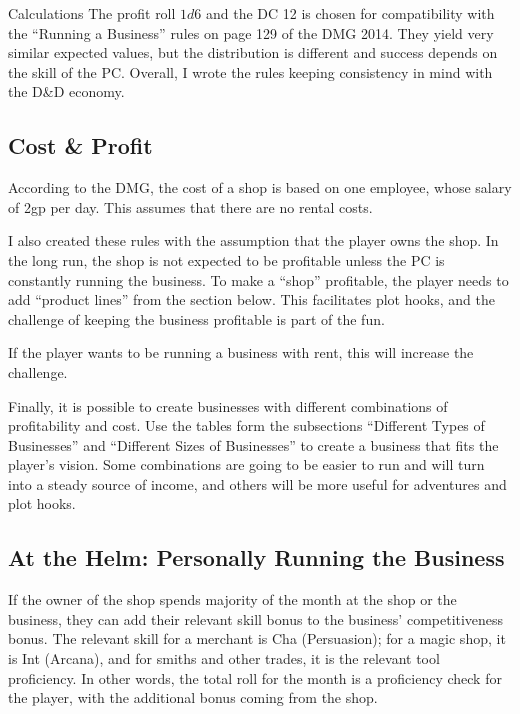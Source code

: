 \documentclass[twocolumn]{dndbook}
\begin{document}
\begin{DndSidebar}[float=!b]{Calculations}
	The profit roll $1d6$ and the DC 12 is chosen for compatibility with
	the ``Running a Business'' rules on page 129 of the DMG 2014.
	They yield very similar expected values, but the distribution is different
	and success depends on the skill of the PC.
	Overall, I wrote the rules keeping consistency in mind with the D\&D economy.
\end{DndSidebar}


\subsection{Cost \& Profit}
According to the DMG, the cost of a shop is based on one employee, whose
salary of 2gp per day. This assumes that there are no rental costs.\par

I also created these rules with the assumption that the player owns the shop.
In the long run, the shop is not expected to be profitable unless
the PC is constantly running the business.
To make a ``shop'' profitable, the player needs to
add ``product lines'' from the section below.
This facilitates plot hooks, and the challenge of keeping the business profitable is part of the fun.\par

If the player wants to be running a business with rent, this will increase the challenge.\par

Finally, it is possible to create businesses with different combinations of profitability and cost.
Use the tables form the subsections ``Different Types of Businesses'' and ``Different Sizes of Businesses'' to create a business
that fits the player's vision. Some combinations are going to be easier to run and will turn into a steady source of income, and others will be more useful for adventures and plot hooks.\par

\subsection{At the Helm: Personally Running the Business}
If the owner of the shop spends majority of the month at the shop or the business,
they can add their relevant skill bonus to the business' competitiveness bonus.
The relevant skill for a merchant is Cha (Persuasion); for a magic shop,
it is Int (Arcana), and for smiths and other trades, it is the relevant tool proficiency.
In other words, the total roll for the month is a proficiency check for the player,
with the additional bonus coming from the shop.\par
\end{document}
